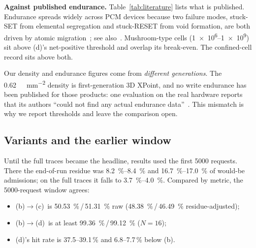 \documentclass[conference]{IEEEtran}
\newcommand{\cfgb}{\textsf{(b)}}
\newcommand{\cfgc}{\textsf{(c)}}
\newcommand{\cfgd}{\textsf{(d)}}
\begin{document}
\textbf{Against published endurance.} Table~\ref{tab:literature} lists what is
published. Endurance spreads widely across PCM devices because two failure
modes, stuck-SET from elemental segregation and stuck-RESET from void
formation, are both driven by atomic migration~\cite{kim2019mrs}; see
also~\cite{wong2010pcm,burr2010pcm}. Mushroom-type cells
(\numrange{1e6}{1e9}) sit above \cfgd's net-positive threshold and overlap its
break-even. The confined-cell record sits above both.

Our density and endurance figures come from \emph{different generations}. The
\SI{0.62}{\giga\bit\per\milli\meter\squared} density is first-generation 3D
XPoint, and no write endurance has been published for those products: one
evaluation on the real hardware reports that its authors ``could not find any
actual endurance data''~\cite{goetze2020pmem}. This mismatch is why we report
thresholds and leave the comparison open.

\subsection{Variants and the earlier window}\label{sec:variants}
Until the full traces became the headline, results used the first
\num{5000} requests. There the end-of-run residue was \SIrange{8.2}{8.4}{\percent}
and \SIrange{16.7}{17.0}{\percent} of would-be admissions; on the full traces
it falls to \SIrange{3.7}{4.0}{\percent}. Compared by metric, the
\num{5000}-request window agrees:
\begin{itemize}
  \item \cfgb$\to$\cfgc\ is \SI{50.53}{\percent}\,/\,\SI{51.31}{\percent} raw
        (\SI{48.38}{\percent}\,/\,\SI{46.49}{\percent} residue-adjusted);
  \item \cfgb$\to$\cfgd\ is at least \SI{99.36}{\percent}\,/\,\SI{99.12}{\percent}
        ($N=16$);
  \item \cfgd's hit rate is 37.5--39.1\,\% and 6.8--7.7\,\% below \cfgb.
\end{itemize}
\end{document}
